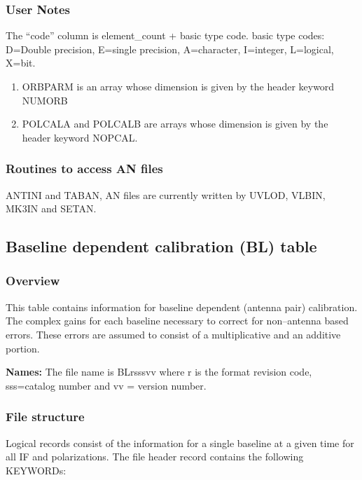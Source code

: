 \subsubsection{User Notes}

  The ``code'' column is  element\_count + basic type code.
basic type codes: D=Double precision, E=single precision,
   A=character, I=integer, L=logical, X=bit.
\begin{enumerate}
\item  ORBPARM is an array whose dimension is given by the header
keyword NUMORB
\item POLCALA and POLCALB are arrays whose dimension is given by
the header keyword NOPCAL.
\end{enumerate}

\subsubsection{ Routines to access AN files}
     ANTINI and TABAN, AN files are currently
written by UVLOD, VLBIN, MK3IN and SETAN.

\subsection{Baseline dependent calibration (BL) table}
\subsubsection{Overview}
 
   This table contains  information for baseline dependent (antenna
pair) calibration.  The complex gains for each baseline necessary to
correct for non--antenna based errors.  These errors are assumed to
consist of a multiplicative and an additive portion.
 
{\bf Names:} The file name is BLrsssvv where r is the format revision
code, sss=catalog number and vv = version number.
 
\subsubsection{File structure}

    Logical records consist of the information for a single baseline at
a given time for all IF and polarizations.  The file header record
contains the following KEYWORDs:

